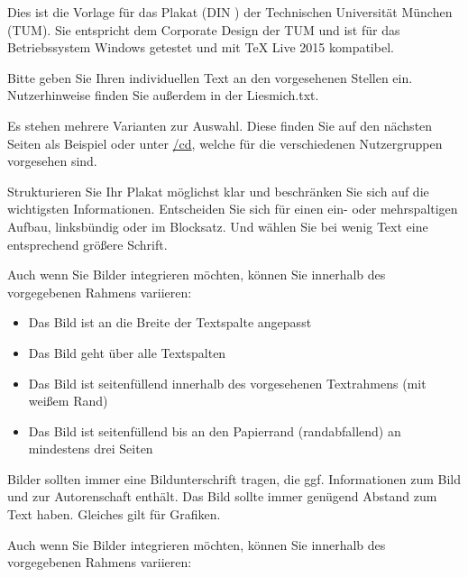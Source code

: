 
Dies ist die Vorlage für das Plakat (DIN \PlakatFormat{}) der Technischen
Universität München (TUM). Sie entspricht dem Corporate Design der TUM und ist für das Betriebssystem Windows getestet und mit TeX Live 2015 kompatibel.

Bitte geben Sie Ihren individuellen Text an den vorgesehenen Stellen ein. Nutzerhinweise finden Sie außerdem in der Liesmich.txt.

\ifx\PlakatBeschreibungKopfzeileUndAbsender\TRUE
{}

Es stehen mehrere Varianten zur Auswahl. Diese finden Sie auf den nächsten Seiten als Beispiel oder unter \href{http://\UniversitaetWebseite/cd}{\UniversitaetWebseite/cd}, welche für die verschiedenen Nutzergruppen vorgesehen sind.

\fi


Strukturieren Sie Ihr Plakat möglichst klar und beschränken Sie sich auf die wichtigsten Informationen. Entscheiden Sie sich für einen ein- oder mehrspaltigen Aufbau, linksbündig oder im Blocksatz. Und wählen Sie bei wenig Text eine entsprechend größere Schrift.


\ifx\PlakatBeschreibungKurz\TRUE %

Auch wenn Sie Bilder integrieren möchten, können Sie innerhalb des vorgegebenen Rahmens variieren:

\begin{itemize}
\item Das Bild ist an die Breite der Textspalte angepasst
\item Das Bild geht über alle Textspalten
\item Das Bild ist seitenfüllend innerhalb des vorgesehenen Textrahmens (mit weißem Rand)
\item Das Bild ist seitenfüllend bis an den Papierrand (randabfallend) an mindestens drei Seiten
\end{itemize}

Bilder sollten immer eine Bildunterschrift tragen, die ggf. Informationen zum Bild und zur Autorenschaft enthält.
Das Bild sollte immer genügend Abstand zum Text haben. Gleiches gilt für Grafiken.

\else

Auch wenn Sie Bilder integrieren möchten, können Sie innerhalb des vorgegebenen Rahmens variieren:

